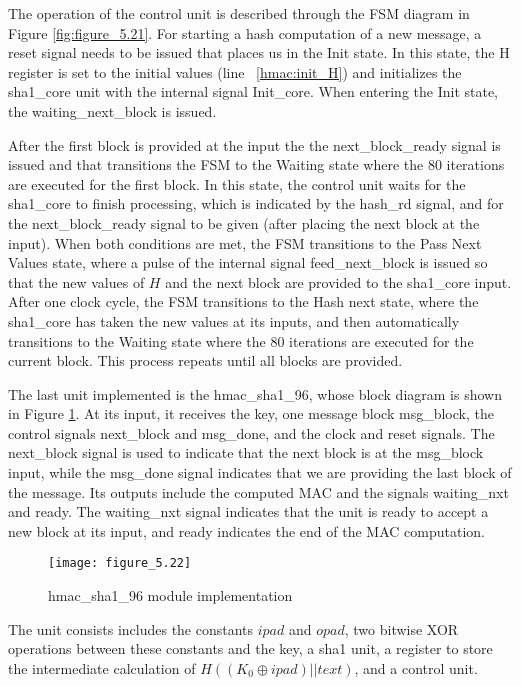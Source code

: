 The operation of the control unit is described through the FSM diagram in Figure \ref{fig:figure_5.21}. For starting a hash computation of a new message, a reset signal needs to be issued that places us in the Init state. In this state, the H register is set to the initial values (line ~\ref{hmac:init_H}) and initializes the sha1\_core unit with the internal signal Init\_core. When entering the Init state, the waiting\_next\_block is issued.

After the first block is provided at the input the the next\_block\_ready signal is issued and that transitions the FSM to the Waiting state where the 80 iterations are executed for the first block. In this state, the control unit waits for the sha1\_core to finish processing, which is indicated by the hash\_rd signal, and for the next\_block\_ready signal to be given (after placing the next block at the input). When both conditions are met, the FSM transitions to the Pass Next Values state, where a pulse of the internal signal feed\_next\_block is issued so that the new values of $H$ and the next block are provided to the sha1\_core input. After one clock cycle, the FSM transitions to the Hash next state, where the sha1\_core has taken the new values at its inputs, and then automatically transitions to the Waiting state where the 80 iterations are executed for the current block. This process repeats until all blocks are provided.

The last unit implemented is the hmac\_sha1\_96, whose block diagram is shown in Figure \ref{fig:figure_5.22}. At its input, it receives the key, one message block msg\_block, the control signals next\_block and msg\_done, and the clock and reset signals. The next\_block signal is used to indicate that the next block is at the msg\_block input, while the msg\_done signal indicates that we are providing the last block of the message. Its outputs include the computed MAC and the signals waiting\_nxt and ready. The waiting\_nxt signal indicates that the unit is ready to accept a new block at its input, and ready indicates the end of the MAC computation.

\begin{figure}
\centering
\texttt{[image: figure\_5.22]}\\
\caption{ hmac\_sha1\_96 module implementation}
\label{fig:figure_5.22}
\end{figure}

The unit consists includes the constants $ipad$ and $opad$, two bitwise XOR operations between these constants and the key, a sha1 unit, a register to store the intermediate calculation of $H((K_0 \oplus ipad) || text)$, and a control unit.

